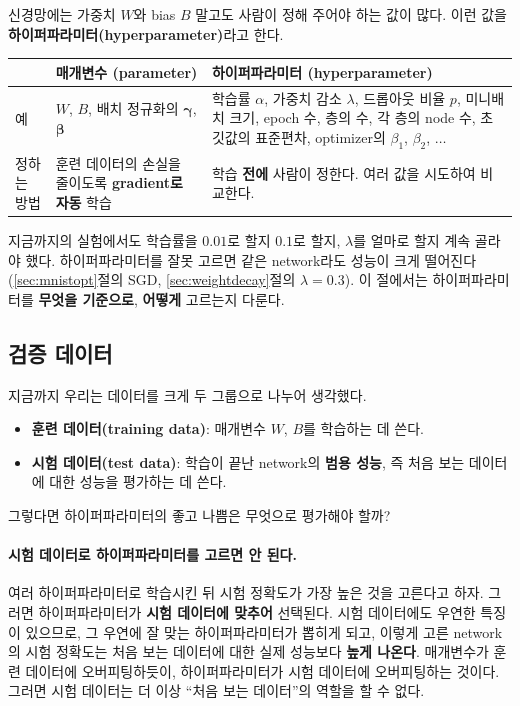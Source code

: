 \documentclass[11pt,a4paper]{article}
\begin{document}
신경망에는 가중치 $W$와 bias $B$ 말고도 사람이 정해 주어야 하는 값이 많다.
이런 값을 \textbf{하이퍼파라미터(hyperparameter)}라고 한다.

\begin{center}
\begin{tabular}{@{}p{}p{}p{}@{}}
\toprule
& 매개변수 (parameter) & 하이퍼파라미터 (hyperparameter) \\
\midrule
예 & $W$, $B$, 배치 정규화의 $\bm\gamma$, $\bm\beta$ &
학습률 $\alpha$, 가중치 감소 $\lambda$, 드롭아웃 비율 $p$, 미니배치 크기, epoch 수, 층의 수, 각 층의 node 수, 초깃값의 표준편차, optimizer의 $\beta_1$, $\beta_2$, $\ldots$ \\[3pt]
정하는 방법 & 훈련 데이터의 손실을 줄이도록 \textbf{gradient로 자동} 학습 & 학습 \textbf{전에} 사람이 정한다. 여러 값을 시도하여 비교한다. \\
\bottomrule
\end{tabular}
\end{center}

지금까지의 실험에서도 학습률을 $0.01$로 할지 $0.1$로 할지, $\lambda$를 얼마로 할지 계속 골라야 했다.
하이퍼파라미터를 잘못 고르면 같은 network라도 성능이 크게 떨어진다 (\ref{sec:mnistopt}절의 SGD, \ref{sec:weightdecay}절의 $\lambda=0.3$).
이 절에서는 하이퍼파라미터를 \textbf{무엇을 기준으로}, \textbf{어떻게} 고르는지 다룬다.

\subsection{검증 데이터}\label{sec:validation}

지금까지 우리는 데이터를 크게 두 그룹으로 나누어 생각했다.
\begin{itemize}[leftmargin=1.8em]
\item \textbf{훈련 데이터(training data)}: 매개변수 $W$, $B$를 학습하는 데 쓴다.
\item \textbf{시험 데이터(test data)}: 학습이 끝난 network의 \textbf{범용 성능}, 즉 처음 보는 데이터에 대한 성능을 평가하는 데 쓴다.
\end{itemize}
그렇다면 하이퍼파라미터의 좋고 나쁨은 무엇으로 평가해야 할까?

\paragraph{시험 데이터로 하이퍼파라미터를 고르면 안 된다.}
여러 하이퍼파라미터로 학습시킨 뒤 시험 정확도가 가장 높은 것을 고른다고 하자.
그러면 하이퍼파라미터가 \textbf{시험 데이터에 맞추어} 선택된다.
시험 데이터에도 우연한 특징이 있으므로, 그 우연에 잘 맞는 하이퍼파라미터가 뽑히게 되고,
이렇게 고른 network의 시험 정확도는 처음 보는 데이터에 대한 실제 성능보다 \textbf{높게 나온다}.
매개변수가 훈련 데이터에 오버피팅하듯이, 하이퍼파라미터가 시험 데이터에 오버피팅하는 것이다.
그러면 시험 데이터는 더 이상 ``처음 보는 데이터''의 역할을 할 수 없다.
\end{document}
